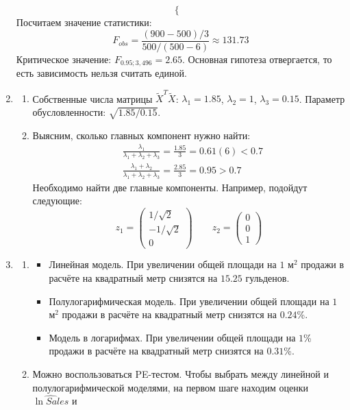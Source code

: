 \begin{enumerate}
\[\begin{cases}
\end{cases}
\]
Посчитаем значение статистики:
\[
F_{obs} = \frac{(900 - 500) / 3}{500 / (500 - 6)} \approx 131.73
\]
Критическое значение: $F_{0.95; 3, 496} = 2.65$. Основная гипотеза отвергается,
то есть зависимость нельзя считать единой.
\item
\begin{enumerate}
  \item Собственные числа матрицы $\tilde X^T \tilde X$: $\lambda_1 = 1.85$,
  $\lambda_2 = 1$, $\lambda_3 = 0.15$. Параметр обусловленности: $\sqrt{1.85 / 0.15}$.
  \item Выясним, сколько главных компонент нужно найти:
  \begin{align*}
    &\frac{\lambda_1}{\lambda_1 + \lambda_2 + \lambda_3} = \frac{1.85}{3} = 0.61(6) < 0.7\\
    &\frac{\lambda_1 + \lambda_2}{\lambda_1 + \lambda_2 + \lambda_3} = \frac{2.85}{3} = 0.95 > 0.7
  \end{align*}
  Необходимо найти две главные компоненты. Например, подойдут следующие:
  \[
  z_1 = \begin{pmatrix}
  1/\sqrt{2} \\ -1 / \sqrt{2} \\ 0
  \end{pmatrix} \qquad
  z_2 = \begin{pmatrix}
  0 \\ 0 \\ 1
  \end{pmatrix}
  \]
\end{enumerate}
\item
\begin{enumerate}
  \item
  \begin{itemize}
    \item Линейная модель. При увеличении общей площади на $1$ м$^2$ продажи
    в расчёте на квадратный метр снизятся на $15.25$ гульденов.
    \item Полулогарифмическая модель. При увеличении общей площади на $1$ м$^2$ продажи
    в расчёте на квадратный метр снизятся на $0.24$\%.
    \item Модель в логарифмах. При увеличении общей площади на $1$\% продажи
    в расчёте на квадратный метр снизятся на $0.31$\%.
  \end{itemize}
  \item Можно воспользоваться PE-тестом. Чтобы выбрать между линейной и полулогарифмической
  моделями, на первом шаге находим оценки $\widehat{\ln Sales}$ и

\end{enumerate}
\end{enumerate}
